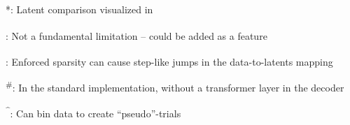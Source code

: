 \begin{table}[th]
\begin{threeparttable}
\begin{tablenotes}[flushleft]
\item **: Latent comparison visualized in 
\item \textsuperscript{\dag}: Not a fundamental limitation -- could be added as a feature
\item \textsuperscript{\ddag}: Enforced sparsity can cause step-like jumps in the data-to-latents mapping
\item \textsuperscript{\#}: In the standard implementation, without a transformer layer in the decoder
\item \textsuperscript{\textasciicircum}: Can bin data to create ``pseudo''-trials
\end{tablenotes}
\end{threeparttable}
\end{table}

\clearpage





